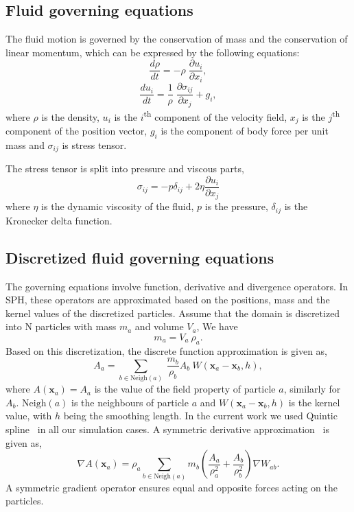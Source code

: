 \documentclass[preprint,12pt]{elsarticle}
\newcommand{\ten}[1]{\ensuremath{\mathbf{#1}}}
\begin{document}
\FloatBarrier%
\subsection{Fluid governing equations}
\label{sec:fluid--governing-equations}
The fluid motion is governed by the conservation of mass and the conservation
of linear momentum, which can be expressed by the following equations:
\begin{equation}
  \label{eq:ce}
  \frac{d \rho}{d t} = - \rho \; \frac{\partial u_i}{\partial x_i},
\end{equation}
\begin{equation}
  \label{eq:me}
  \frac{d u_i}{d t} = \frac{1}{\rho} \; \frac{\partial \sigma_{ij}}{\partial x_j}
  + g_i,
\end{equation}
where $\rho$ is the density, $u_i$ is the $i$\textsuperscript{th} component of
the velocity field, $x_j$ is the $j$\textsuperscript{th} component of the
position vector, $g_i$ is the component of body force per unit mass and
$\sigma_{ij}$ is stress tensor.

The stress tensor is split into pressure and viscous parts,
\begin{equation}
  \label{eq:fluid-stress-decomposition}
  \sigma_{ij} = - p \delta_{ij} + 2 \eta \frac{\partial u_i}{\partial x_j}
\end{equation}
where $\eta$ is the dynamic viscosity of the fluid, $p$ is the pressure,
$\delta_{ij}$ is the Kronecker delta function.


\FloatBarrier%
\subsection{Discretized fluid governing equations}
\label{sec:sph--governing-equations}
The governing equations involve function, derivative and divergence
operators. In SPH, these operators are approximated based on the positions,
mass and the kernel values of the discretized particles. Assume that the
domain is discretized into N particles with mass $m_a$ and volume
$V_a$, We have
\begin{equation}
  \label{eq:mass_repr}
  m_a = V_a \> \rho_a.
\end{equation}
Based on this discretization, the discrete function approximation is given as,
\begin{equation}
  \label{eq:discrete_form}
  A_a = \sum_{b \in \text{Neigh}(a)}\> \frac{m_b}{\rho_b} A_b\> W(\ten{x}_a - \ten{x}_b, h),
\end{equation}
where $A(\boldsymbol{x}_a) = A_a$ is the value of the field property of
particle $a$, similarly for $A_b$. $\text{Neigh}(a)$ is the neighbours of
particle $a$ and $W(\ten{x}_a - \ten{x}_b, h)$ is the kernel value, with $h$
being the smoothing length. In the current work we used Quintic
spline~\cite{Violeau16} in all our simulation cases.  A symmetric derivative
approximation~\cite{Violeau16} is given as,
\begin{equation}
  \nabla A(\ten{x}_a) = \rho_a \sum_{b \in \text{Neigh}(a)} m_b \left(\frac{A_a}{\rho_a^2} + \frac{A_b}{\rho_b^2}\right) \nabla W_{ab}.
\end{equation}
A symmetric gradient operator ensures equal and opposite forces acting on the
particles.
\end{document}
